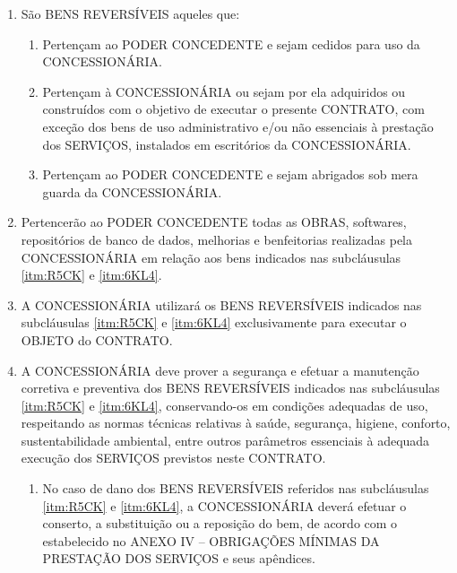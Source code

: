 \documentclass[a4paper,11pt]{report} %
\begin{document}
\begin{enumerate}
\item \label{itm:P87W} São BENS REVERSÍVEIS aqueles que:

\begin{enumerate}[label*=\arabic*.]
\item \label{itm:R5CK}	Pertençam ao PODER CONCEDENTE e sejam cedidos para uso da CONCESSIONÁRIA.

\item \label{itm:6KL4} Pertençam à CONCESSIONÁRIA ou sejam por ela adquiridos ou construídos com o objetivo de executar o presente CONTRATO, com exceção dos bens de uso administrativo e/ou não essenciais à prestação dos SERVIÇOS, instalados em escritórios da CONCESSIONÁRIA.

\item \label{itm:SKHH} Pertençam ao PODER CONCEDENTE e sejam abrigados sob mera guarda da CONCESSIONÁRIA.
\end{enumerate}

\item \label{itm:5BHI} Pertencerão ao PODER CONCEDENTE todas as OBRAS, softwares, repositórios de banco de dados, melhorias e benfeitorias realizadas pela CONCESSIONÁRIA em relação aos bens indicados nas subcláusulas \ref{itm:R5CK} e \ref{itm:6KL4}.

\item \label{itm:723N} A CONCESSIONÁRIA utilizará os BENS REVERSÍVEIS indicados nas subcláusulas \ref{itm:R5CK} e \ref{itm:6KL4} exclusivamente para executar o OBJETO do CONTRATO.

\item \label{itm:7BBJ} A CONCESSIONÁRIA deve prover a segurança e efetuar a manutenção corretiva e preventiva dos BENS REVERSÍVEIS indicados nas subcláusulas \ref{itm:R5CK} e \ref{itm:6KL4}, conservando-os em condições adequadas de uso, respeitando as normas técnicas relativas à saúde, segurança, higiene, conforto, sustentabilidade ambiental, entre outros parâmetros essenciais à adequada execução dos SERVIÇOS previstos neste CONTRATO.

\begin{enumerate}[label*=\arabic*.]
\item \label{itm:628D} No caso de dano dos BENS REVERSÍVEIS referidos nas subcláusulas \ref{itm:R5CK} e \ref{itm:6KL4}, a CONCESSIONÁRIA deverá efetuar o conserto, a substituição ou a reposição do bem, de acordo com o estabelecido no ANEXO IV – OBRIGAÇÕES MÍNIMAS DA PRESTAÇÃO DOS SERVIÇOS e seus apêndices.
\end{enumerate}


\end{enumerate}
\end{document}
